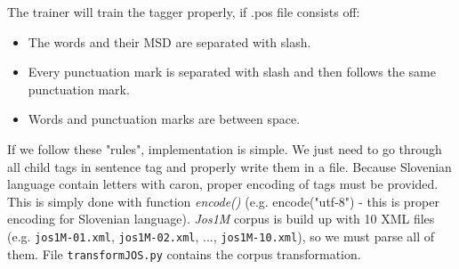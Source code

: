 \documentclass[10pt, conference, compsocconf]{IEEEtran}
\begin{document}
The trainer will train the tagger properly, if .pos file consists off:
\begin{itemize}
\item The words and their MSD are separated with slash.
\item Every punctuation mark is separated with slash and then follows the same punctuation mark.
\item Words and punctuation marks are between space.
\end{itemize}

If we follow these "rules", implementation is simple. We just need to go through all child tags in sentence tag and properly write them in a file. Because Slovenian language contain letters with caron, proper encoding of tags must be provided. This is simply done with function \textit{encode()} (e.g. encode("utf-8") - this is proper encoding for Slovenian language).
\textit{Jos1M} corpus is build up with 10 XML files (e.g. \texttt{jos1M-01.xml},  \texttt{jos1M-02.xml}, ..., \texttt{jos1M-10.xml}), so we must parse all of them. 
File \texttt{transformJOS.py} contains the corpus transformation.
\end{document}
